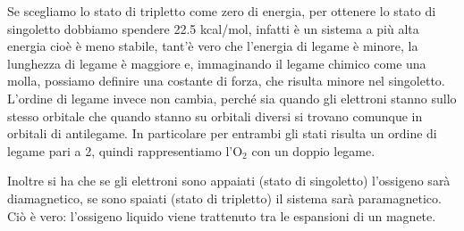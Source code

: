 Se scegliamo lo stato di tripletto come zero di energia, per ottenere lo stato di singoletto dobbiamo spendere 22.5 kcal/mol, infatti è un sistema a più alta energia cioè è meno stabile, tant'è vero che l'energia di legame è minore, la lunghezza di legame è maggiore e, immaginando il legame chimico come una molla, possiamo definire una costante di forza, che risulta minore nel singoletto. L'ordine di legame invece non cambia, perché sia quando gli elettroni stanno sullo stesso orbitale che quando stanno su orbitali diversi si trovano comunque in orbitali di antilegame. In particolare per entrambi gli stati risulta un ordine di legame pari a 2, quindi rappresentiamo l'O$_2$ con un doppio legame. 

Inoltre si ha che se gli elettroni sono appaiati (stato di singoletto) l'ossigeno sarà diamagnetico, se sono spaiati (stato di tripletto) il sistema sarà paramagnetico. Ciò è vero: l'ossigeno liquido viene trattenuto tra le espansioni di un magnete.


